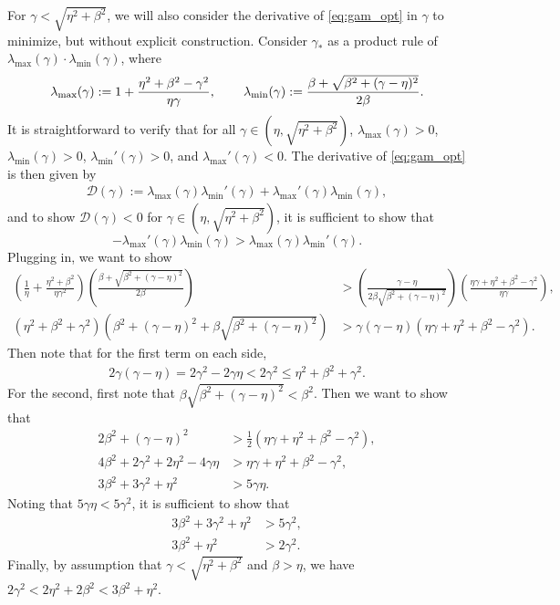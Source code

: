 \documentclass[a4paper,10pt]{article}
\begin{document}
For $\gamma < \sqrt{\eta^2+\beta^2}$, we will also consider the derivative
of \eqref{eq:gam_opt} in $\gamma$ to minimize, but without explicit construction.
Consider $\gamma_*$ as a product rule of $\lambda_{\max}(\gamma)\cdot
\lambda_{\min}(\gamma)$, where
%
\begin{align*}
\lambda_{\max}(\gamma) := 1 + \frac{\eta^2+\beta^2 - \gamma^2}{\eta\gamma}, \hspace{5ex}
\lambda_{\min}(\gamma) := \frac{\beta + \sqrt{\beta^2 + (\gamma-\eta)^2}}{2\beta}.
\end{align*}
%
It is straightforward to verify that for all $\gamma\in(\eta,\sqrt{\eta^2+\beta^2})$,
$\lambda_{\max}(\gamma) > 0$, $\lambda_{\min}(\gamma) > 0$, $\lambda_{\min}'(\gamma) > 0$,
and $\lambda_{\max}'(\gamma) < 0$. The derivative of \eqref{eq:gam_opt} is then
given by 
%
\begin{align*}
\mathcal{D}(\gamma) := \lambda_{\max}(\gamma)\lambda_{\min}'(\gamma) +
	\lambda_{\max}'(\gamma)\lambda_{\min}(\gamma),
\end{align*}
%
and to show $\mathcal{D}(\gamma) < 0$ for $\gamma\in(\eta,\sqrt{\eta^2+\beta^2})$,
it is sufficient to show that
%
\begin{equation*}
-\lambda_{\max}'(\gamma)\lambda_{\min}(\gamma) > \lambda_{\max}(\gamma)\lambda_{\min}'(\gamma).
\end{equation*}
%
Plugging in, we want to show
%
\begin{align*}
\left(\frac{1}{\eta} + \frac{\eta^2+\beta^2}{\eta\gamma^2}\right)
	\left(\frac{\beta + \sqrt{\beta^2 + (\gamma-\eta)^2}}{2\beta}\right) 
& > \left(\frac{\gamma-\eta}{2\beta\sqrt{\beta^2+(\gamma-\eta)^2}} \right)
	\left(\frac{\eta\gamma+\eta^2+\beta^2-\gamma^2}{\eta\gamma}\right), \\
\left(\eta^2+\beta^2+\gamma^2\right)
	\left(\beta^2 + (\gamma-\eta)^2 + \beta\sqrt{\beta^2+(\gamma-\eta)^2}\right)
& > \gamma(\gamma-\eta)\left(\eta\gamma+\eta^2+\beta^2-\gamma^2\right).
\end{align*}
%
Then note that for the first term on each side,
%
\begin{align*}
2\gamma(\gamma-\eta) = 2\gamma^2 - 2\gamma\eta < 2\gamma^2 \leq \eta^2+\beta^2 + \gamma^2.
\end{align*}
%
For the second, first note that $\beta\sqrt{\beta^2+(\gamma-\eta)^2} < \beta^2$.
Then we want to show that
%
\begin{align*}
2\beta^2 + (\gamma-\eta)^2 & > \frac{1}{2}\left(\eta\gamma+\eta^2+\beta^2-\gamma^2\right), \\
4\beta^2 + 2\gamma^2 + 2\eta^2 - 4\gamma\eta & > \eta\gamma+\eta^2+\beta^2-\gamma^2, \\
3\beta^2 + 3\gamma^2 + \eta^2 & > 5 \gamma\eta.
\end{align*}
%
Noting that $5\gamma\eta < 5\gamma^2$, it is sufficient to show that 
%
\begin{align*}
3\beta^2 + 3\gamma^2 + \eta^2 & > 5 \gamma^2, \\
3\beta^2 + \eta^2 & > 2 \gamma^2.
\end{align*}
%
Finally, by assumption that $\gamma < \sqrt{\eta^2+\beta^2}$ and $\beta > \eta$,
we have $2\gamma^2 < 2\eta^2+2\beta^2 < 3\beta^2+\eta^2$.
\end{document}
